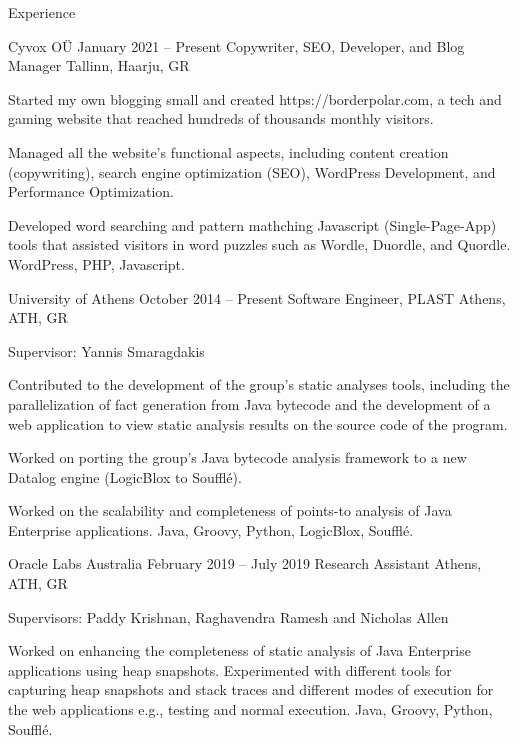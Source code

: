 \documentclass{resume}
\begin{document}
\begin{rSection}{Experience}

  \begin{rSubsection}
    {Cyvox OÜ}
    {January 2021 -- Present}
    {Copywriter, SEO, Developer, and Blog Manager}
    {Tallinn, Haarju, GR}
  \item Started my own blogging small and created https://borderpolar.com, a tech and gaming website that reached hundreds of thousands monthly visitors.
  \item Managed all the website's functional aspects, including content creation (copywriting), search engine optimization (SEO), WordPress Development, and Performance Optimization.
  \item Developed word searching and pattern mathching Javascript (Single-Page-App) tools that assisted visitors in word puzzles such as Wordle, Duordle, and Quordle. 
  \footnotesize\textcolor{MyColor}{WordPress, PHP, Javascript.}
  \end{rSubsection}

\begin{rSubsection}
  {University of Athens}
  {October 2014 -- Present}
  {Software Engineer, PLAST}
  {Athens, ATH, GR}
\item Supervisor: Yannis Smaragdakis
\item Contributed to the development of the group's static analyses tools, including the
  parallelization of fact generation from Java bytecode and the development
  of a web application to view static analysis results on the source code of the program.
\item Worked on porting the group's Java bytecode analysis framework to a new Datalog engine (LogicBlox to Soufflé).
\item Worked on the scalability and completeness of points-to analysis of Java Enterprise applications.
\footnotesize\textcolor{MyColor}{Java, Groovy, Python, LogicBlox, Soufflé.}
\end{rSubsection}

\begin{rSubsection}
  {Oracle Labs Australia}
  {February 2019 -- July 2019}
  {Research Assistant}
  {Athens, ATH, GR}
\item Supervisors: Paddy Krishnan, Raghavendra Ramesh and Nicholas Allen
\item Worked on enhancing the completeness of static analysis of Java Enterprise applications using heap snapshots.
Experimented with different tools for capturing heap snapshots and stack traces and different modes of execution
for the web applications e.g., testing and normal execution.
\footnotesize\textcolor{MyColor}{Java, Groovy, Python, Soufflé.}
\end{rSubsection}



\end{rSection}
\end{document}
